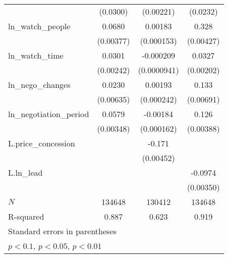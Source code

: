 {\begin{tabular}{l*{3}{c}}
            &    (0.0300)         &   (0.00221)         &    (0.0232)         \\
\addlinespace
ln\_watch\_people&      0.0680\sym{***}&     0.00183\sym{***}&       0.328\sym{***}\\
            &   (0.00377)         &  (0.000153)         &   (0.00427)         \\
\addlinespace
ln\_watch\_time&      0.0301\sym{***}&   -0.000209\sym{**} &      0.0327\sym{***}\\
            &   (0.00242)         & (0.0000941)         &   (0.00202)         \\
\addlinespace
ln\_nego\_changes&      0.0230\sym{***}&     0.00193\sym{***}&       0.133\sym{***}\\
            &   (0.00635)         &  (0.000242)         &   (0.00691)         \\
\addlinespace
ln\_negotiation\_period&      0.0579\sym{***}&    -0.00184\sym{***}&       0.126\sym{***}\\
            &   (0.00348)         &  (0.000162)         &   (0.00388)         \\
\addlinespace
L.price\_concession&                     &      -0.171\sym{***}&                     \\
            &                     &   (0.00452)         &                     \\
\addlinespace
L.ln\_lead   &                     &                     &     -0.0974\sym{***}\\
            &                     &                     &   (0.00350)         \\
\midrule
\(N\)       &      134648         &      130412         &      134648         \\
R-squared   &       0.887         &       0.623         &       0.919         \\
\bottomrule
\multicolumn{4}{l}{\footnotesize Standard errors in parentheses}\\
\multicolumn{4}{l}{\footnotesize \sym{*} \(p<0.1\), \sym{**} \(p<0.05\), \sym{***} \(p<0.01\)}\\
\end{tabular}
}
